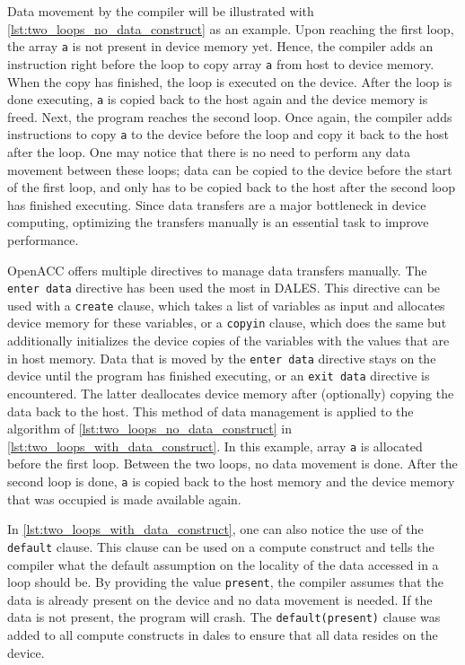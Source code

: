 Data movement by the compiler will be illustrated with \autoref{lst:two_loops_no_data_construct} as an example. Upon reaching the first loop, the array \texttt{a} is not present in device memory yet. Hence, the compiler adds an instruction right before the loop to copy array \texttt{a} from host to device memory. When the copy has finished, the loop is executed on the device. After the loop is done executing, \texttt{a} is copied back to the host again and the device memory is freed. Next, the program reaches the second loop. Once again, the compiler adds instructions to copy \texttt{a} to the device before the loop and copy it back to the host after the loop. One may notice that there is no need to perform any data movement between these loops; data can be copied to the device before the start of the first loop, and only has to be copied back to the host after the second loop has finished executing. Since data transfers are a major bottleneck in device computing, optimizing the transfers manually is an essential task to improve performance. 

OpenACC offers multiple directives to manage data transfers manually. The \texttt{enter data} directive has been used the most in DALES. This directive can be used with a \texttt{create} clause, which takes a list of variables as input and allocates device memory for these variables, or a \texttt{copyin} clause, which does the same but additionally initializes the device copies of the variables with the values that are in host memory. Data that is moved by the \texttt{enter data} directive stays on the device until the program has finished executing, or an \texttt{exit data} directive is encountered. The latter deallocates device memory after (optionally) copying the data back to the host. This method of data management is applied to the algorithm of \autoref{lst:two_loops_no_data_construct} in \autoref{lst:two_loops_with_data_construct}. In this example, array \texttt{a} is allocated before the first loop. Between the two loops, no data movement is done. After the second loop is done, \texttt{a} is copied back to the host memory and the device memory that was occupied is made available again.

In \autoref{lst:two_loops_with_data_construct}, one can also notice the use of the \texttt{default} clause. This clause can be used on a compute construct and tells the compiler what the default assumption on the locality of the data accessed in a loop should be. By providing the value \texttt{present}, the compiler assumes that the data is already present on the device and no data movement is needed. If the data is not present, the program will crash. The \texttt{default(present)} clause was added to all compute constructs in \acrshort{dales} to ensure that all data resides on the device.


